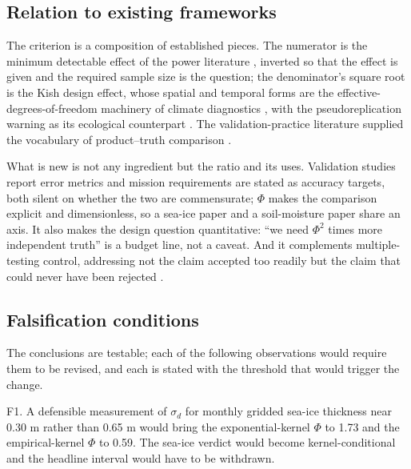 \documentclass[preprint,12pt,authoryear]{elsarticle}
\begin{document}
\subsection{Relation to existing frameworks}

The criterion is a composition of established pieces. The numerator is the minimum detectable effect of the power literature \citep{cohen1992power,lenth2001some,nakagawa2007effect}, inverted so that the effect is given and the required sample size is the question; the denominator's square root is the Kish design effect, whose spatial and temporal forms are the effective-degrees-of-freedom machinery of climate diagnostics \citep{bretherton1999effective,zwiers1995taking,kunsch1989jackknife,politis1994stationary}, with the pseudoreplication warning as its ecological counterpart \citep{hurlbert1984pseudoreplication,legendre1993spatial,dutilleul1993modifying}. The validation-practice literature supplied the vocabulary of product--truth comparison \citep{loew2017validation,merchant2017uncertainty,taylor2001summarizing}.

What is new is not any ingredient but the ratio and its uses. Validation studies report error metrics and mission requirements are stated as accuracy targets, both silent on whether the two are commensurate; $\Phi$ makes the comparison explicit and dimensionless, so a sea-ice paper and a soil-moisture paper share an axis. It also makes the design question quantitative: ``we need $\Phi^{2}$ times more independent truth'' is a budget line, not a caveat. And it complements multiple-testing control, addressing not the claim accepted too readily but the claim that could never have been rejected \citep{benjamini1995controlling,storey2002direct}.

\subsection{Falsification conditions}
\label{sec:falsification}

The conclusions are testable; each of the following observations would require them to be revised, and each is stated with the threshold that would trigger the change.

F1. A defensible measurement of $\sigma_d$ for monthly gridded sea-ice thickness near 0.30 m rather than 0.65 m would bring the exponential-kernel $\Phi$ to 1.73 and the empirical-kernel $\Phi$ to 0.59. The sea-ice verdict would become kernel-conditional and the headline interval would have to be withdrawn.
\end{document}
